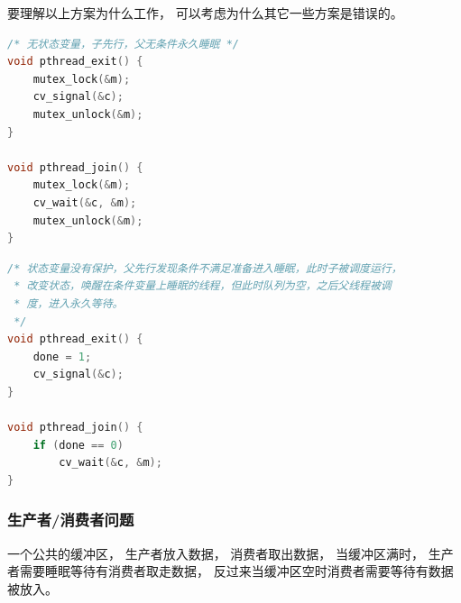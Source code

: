 \documentclass[11pt]{article}
\begin{document}
要理解以上方案为什么工作，
可以考虑为什么其它一些方案是错误的。
\begin{lstlisting}[language=C]
/* 无状态变量，子先行，父无条件永久睡眠 */
void pthread_exit() {
	mutex_lock(&m);
	cv_signal(&c);
	mutex_unlock(&m);
}

void pthread_join() {
	mutex_lock(&m);
	cv_wait(&c, &m);
	mutex_unlock(&m);
}
\end{lstlisting}

\begin{lstlisting}[language=C]
/* 状态变量没有保护，父先行发现条件不满足准备进入睡眠，此时子被调度运行，
 * 改变状态，唤醒在条件变量上睡眠的线程，但此时队列为空，之后父线程被调
 * 度，进入永久等待。
 */
void pthread_exit() {
	done = 1;
	cv_signal(&c);
}

void pthread_join() {
	if (done == 0)
		cv_wait(&c, &m);
}
\end{lstlisting}

\subsubsection{生产者/消费者问题}
一个公共的缓冲区，
生产者放入数据，
消费者取出数据，
当缓冲区满时，
生产者需要睡眠等待有消费者取走数据，
反过来当缓冲区空时消费者需要等待有数据被放入。
\end{document}
